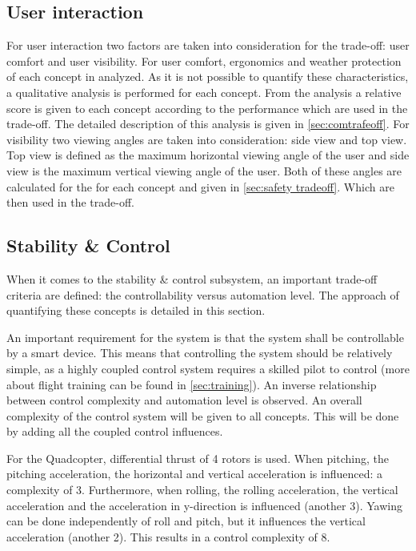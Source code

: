 \subsection{User interaction}
For user interaction two factors are taken into consideration for the trade-off: user comfort and user visibility. For user comfort, ergonomics and weather protection of each concept in analyzed. As it is not possible to quantify these characteristics, a qualitative analysis is performed for each concept. From the analysis a relative score is given to each concept according to the performance which are used in the trade-off. The detailed description of this analysis is given in \autoref{sec:comtrafeoff}. For visibility two viewing angles are taken into consideration: side view and top view. Top view is defined as the maximum horizontal viewing angle of the user and side view is the maximum vertical viewing angle of the user. Both of these angles are calculated for the for each concept and given in \autoref{sec:safety tradeoff}. Which are then used in the trade-off.

\subsection{Stability \& Control}

When it comes to the stability \& control subsystem, an important trade-off criteria are defined: the controllability versus automation level. The approach of quantifying these concepts is detailed in this section. 

An important requirement for the system is that the system shall be controllable by a smart device. This means that controlling the system should be relatively simple, as a highly coupled control system requires a skilled pilot to control (more about flight training can be found in \autoref{sec:training}). An inverse relationship between control complexity and automation level is observed. An overall complexity of the control system will be given to all concepts. This will be done by adding all the coupled control influences.

For the Quadcopter, differential thrust of 4 rotors is used. When pitching, the pitching acceleration, the horizontal and vertical acceleration is influenced: a complexity of 3. Furthermore, when rolling, the rolling acceleration, the vertical acceleration and the acceleration in y-direction is influenced (another 3). Yawing can be done independently of roll and pitch, but it influences the vertical acceleration (another 2). This results in a control complexity of 8.

